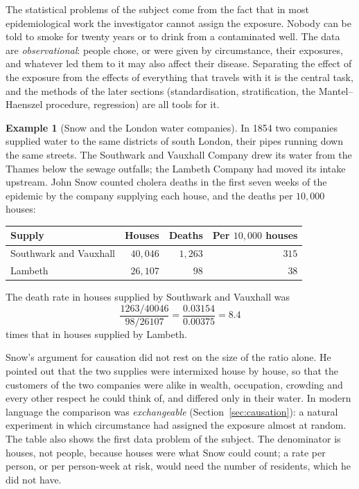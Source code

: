 \documentclass[11pt,a4paper]{article}
\numberwithin{equation}{section}
\theoremstyle{definition}
\newtheorem{exa}[thm]{Example}
\begin{document}
The statistical problems of the subject come from the fact that in most epidemiological work the investigator cannot assign the exposure.
Nobody can be told to smoke for twenty years or to drink from a contaminated well. The data are \emph{observational}: people chose, or
were given by circumstance, their exposures, and whatever led them to it may also affect their disease. Separating the effect of the
exposure from the effects of everything that travels with it is the central task, and the methods of the later sections (standardisation,
stratification, the Mantel--Haenszel procedure, regression) are all tools for it.

\begin{exa}[Snow and the London water companies]
\label{exa:snow}
In 1854 two companies supplied water to the same districts of south London, their pipes running down the same streets. The Southwark and
Vauxhall Company drew its water from the Thames below the sewage outfalls; the Lambeth Company had moved its intake upstream. John Snow
counted cholera deaths in the first seven weeks of the epidemic by the company supplying each house, and the deaths per
$10{,}000$ houses:
\begin{center}
\begin{tabular}{lrrr}
\hline
Supply & Houses & Deaths & Per $10{,}000$ houses \\
\hline
Southwark and Vauxhall & $40{,}046$ & $1{,}263$ & $315$ \\
Lambeth & $26{,}107$ & $98$ & $38$ \\
\hline
\end{tabular}
\end{center}
The death rate in houses supplied by Southwark and Vauxhall was
\[
\frac{1263/40046}{98/26107} = \frac{0.03154}{0.00375} = 8.4
\]
times that in houses supplied by Lambeth.

Snow's argument for causation did not rest on the size of the ratio alone. He pointed out that the two supplies were intermixed house by
house, so that the customers of the two companies were alike in wealth, occupation, crowding and every other respect he could think of,
and differed only in their water. In modern language the comparison was \emph{exchangeable} (Section~\ref{sec:causation}): a natural
experiment in which circumstance had assigned the exposure almost at random. The table also shows the first data problem of the
subject. The denominator is houses, not people, because houses were what Snow could count; a rate per person, or per person-week at
risk, would need the number of residents, which he did not have.
\end{exa}
\end{document}
